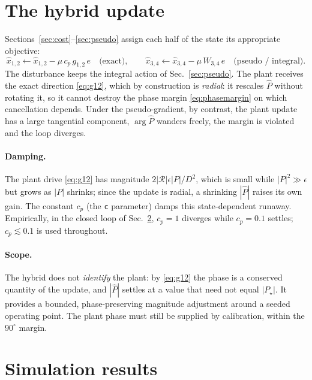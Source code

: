 \documentclass[11pt]{article}
\begin{document}
\section{The hybrid update}
\label{sec:hybrid}

Sections~\ref{sec:cost}--\ref{sec:pseudo} assign each half of the state its
appropriate objective:
\begin{equation}
  \hat x_{1,2}\leftarrow\hat x_{1,2}-\mu\,c_p\,g_{1,2}\,e
  \quad\text{(exact)},
  \qquad
  \hat x_{3,4}\leftarrow\hat x_{3,4}-\mu\,W_{3,4}\,e
  \quad\text{(pseudo / integral)} .
  \label{eq:hybrid}
\end{equation}
The disturbance keeps the integral action of Sec.~\ref{sec:pseudo}. The
plant receives the exact direction \eqref{eq:g12}, which by construction is
\emph{radial}: it rescales $\hat P$ without rotating it, so it cannot
destroy the phase margin \eqref{eq:phasemargin} on which cancellation
depends. Under the pseudo-gradient, by contrast, the plant update has a
large tangential component, $\arg\hat P$ wanders freely, the margin is
violated and the loop diverges.

\paragraph{Damping.}
The plant drive \eqref{eq:g12} has magnitude
$2|\mathcal{R}|\epsilon|P|/D^2$, which is small while
$|P|^2\gg\epsilon$ but grows as $|P|$ shrinks; since the update is radial,
a shrinking $|\hat P|$ raises its own gain. The constant $c_p$ (the
\texttt{c} parameter) damps this state-dependent runaway. Empirically, in
the closed loop of Sec.~\ref{sec:sim}, $c_p=1$ diverges while $c_p=0.1$
settles; $c_p\lesssim0.1$ is used throughout.

\paragraph{Scope.}
The hybrid does not \emph{identify} the plant: by \eqref{eq:g12} the phase
is a conserved quantity of the update, and $|\hat P|$ settles at a value
that need not equal $|P_\star|$. It provides a bounded, phase-preserving
magnitude adjustment around a seeded operating point. The plant phase must
still be supplied by calibration, within the $90^\circ$ margin.

\section{Simulation results}
\label{sec:sim}
\end{document}
